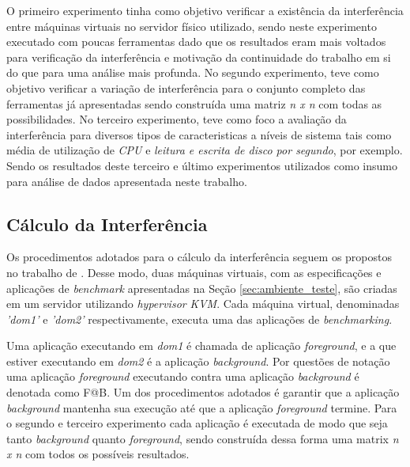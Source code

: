 O primeiro experimento tinha como objetivo verificar a existência da interferência entre máquinas virtuais no servidor físico utilizado, sendo neste experimento executado com poucas ferramentas dado que os resultados eram mais voltados para verificação da interferência e motivação da continuidade do trabalho em si do que para uma análise mais profunda. No segundo experimento, teve como objetivo verificar a variação de interferência para o conjunto completo das ferramentas já apresentadas sendo construída uma matriz \textit{n x n} com todas as possibilidades. No terceiro experimento, teve como foco a avaliação da interferência para diversos tipos de caracteristicas a níveis de sistema tais como média de utilização de \textit{CPU} e \textit{leitura e escrita de disco por segundo}, por exemplo. Sendo os resultados deste terceiro e último experimentos utilizados como insumo para análise de dados apresentada neste trabalho.%

\subsection{Cálculo da Interferência}
Os procedimentos adotados para o cálculo da interferência seguem os propostos no trabalho de . Desse modo, duas máquinas virtuais, com as especificações e aplicações de \textit{benchmark} apresentadas na Seção \ref{sec:ambiente_teste}, são criadas em um servidor utilizando \textit{hypervisor} \textit{KVM}. Cada máquina virtual, denominadas \textit{'dom1'} e \textit{'dom2'} respectivamente, executa uma das aplicações de \textit{benchmarking}. 

Uma aplicação executando em \textit{dom1} é chamada de aplicação \textit{foreground}, e a que estiver executando em \textit{dom2} é a aplicação \textit{background}. Por questões de notação uma aplicação \textit{foreground} executando contra uma aplicação \textit{background} é denotada como F@B. Um dos procedimentos adotados é garantir que a aplicação \textit{background} mantenha sua execução até que a aplicação \textit{foreground} termine. Para o segundo e terceiro experimento cada aplicação é executada de modo que seja tanto \textit{background} quanto \textit{foreground}, sendo construída dessa forma uma matrix \textit{n x n} com todos os possíveis resultados. %

